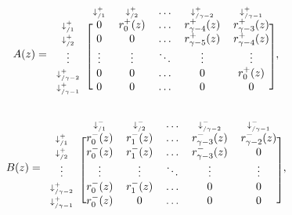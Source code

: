 \documentclass{article}
\begin{document}
\begin{equation*}
A(z) = 
\begin{blockarray}{cccccc}
   & \scriptstyle{\downarrow_{/1}^+} & \scriptstyle{\downarrow_{/2}^+} &
    \ldots & \scriptstyle{\downarrow_{/\gamma-2}^+} &
    \scriptstyle{\downarrow_{/\gamma-1}^+} \\
\begin{block}{c[ccccc]}
\scriptstyle{\downarrow_{/1}^+} & 0 & r_0^+(z) & \ldots &
    r_{\gamma-4}^+(z) & r_{\gamma-3}^+(z) \\
\scriptstyle{\downarrow_{/2}^+} & 0 & 0 & \ldots &
    r_{\gamma-5}^+(z) & r_{\gamma-4}^+(z) \\
\vdots & \vdots & \vdots & \ddots & \vdots & \vdots \\
\scriptstyle{\downarrow_{/\gamma-2}^+} & 0 & 0 & \ldots & 0 & r_0^+(z) \\
\scriptstyle{\downarrow_{/\gamma-1}^+} & 0 & 0 & \ldots & 0 & 0 \\
\end{block}
\end{blockarray},
\end{equation*}

\begin{equation*}
B(z) = 
\begin{blockarray}{cccccc}
   & \scriptstyle{\downarrow_{/1}^-} & \scriptstyle{\downarrow_{/2}^-} &
   \ldots & \scriptstyle{\downarrow_{/\gamma-2}^-} &
   \scriptstyle{\downarrow_{/\gamma-1}^-} \\
\begin{block}{c[ccccc]}
\scriptstyle{\downarrow_{/1}^+} & r_0^-(z) & r_1^-(z) & \ldots &
    r_{\gamma-3}^-(z) & r_{\gamma-2}^-(z) \\
\scriptstyle{\downarrow_{/2}^+} & r_0^-(z) & r_1^-(z) & \ldots &
    r_{\gamma-3}^-(z) & 0 \\
\vdots & \vdots & \vdots & \ddots & \vdots & \vdots \\
\scriptstyle{\downarrow_{/\gamma-2}^+} & r_0^-(z) & r_1^-(z) &
    \ldots & 0 & 0 \\
\scriptstyle{\downarrow_{/\gamma-1}^+} & r_0^-(z) & 0 & \ldots & 0 & 0 \\
\end{block}
\end{blockarray},
\end{equation*}
\end{document}

